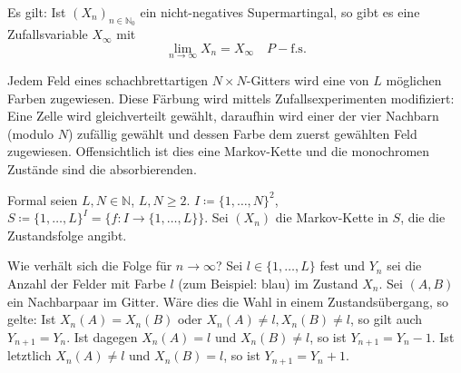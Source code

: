 \documentclass[a4paper,twoside,DIV15,BCOR12mm]{scrbook}
\begin{document}
\begin{bemerkung}
Es gilt: Ist $(X_n)_{n\in\mathbb N_0}$ ein nicht-negatives Supermartingal, so gibt es eine Zufallsvariable $X_\infty$ mit 
\[
\lim_{n\to\infty} X_n = X_\infty \quad P-\text{f.s.}
\]
\end{bemerkung}

\begin{beispiel}
Jedem Feld eines schachbrettartigen $N\times N$-Gitters wird eine von $L$ möglichen Farben zugewiesen. Diese Färbung wird mittels Zufallsexperimenten modifiziert: Eine Zelle wird gleichverteilt gewählt, daraufhin wird einer der vier Nachbarn (modulo $N$) zufällig gewählt und dessen Farbe dem zuerst gewählten Feld zugewiesen. Offensichtlich ist dies eine Markov-Kette und die monochromen Zustände sind die absorbierenden.

\begin{center}
\end{center}

Formal seien $L,N\in \mathbb N$, $L,N\ge 2$. $I\coloneqq\{1,\ldots,N\}^2$, $S\coloneqq \{1,\ldots,L\}^I = \{f:I\to \{1,\ldots,L\}\}$. Sei $(X_n)$ die Markov-Kette in $S$, die die Zustandsfolge angibt.

Wie verhält sich die Folge für $n\to\infty$? Sei $l\in\{1,\ldots,L\}$ fest und $Y_n$ sei die Anzahl der Felder mit Farbe $l$ (zum Beispiel: blau) im Zustand $X_n$. Sei $(A,B)$ ein Nachbarpaar im Gitter. Wäre dies die Wahl in einem Zustandsübergang, so gelte: Ist $X_n(A)=X_n(B)$ oder $X_n(A)\ne l, X_n(B)\ne l$, so gilt auch $Y_{n+1}=Y_n$. Ist dagegen $X_n(A)=l$ und $X_n(B)\ne l$, so ist $Y_{n+1}=Y_n-1$. Ist letztlich $X_n(A)\ne l$ und $X_n(B) =l$, so ist $Y_{n+1}=Y_n+1$.


\end{beispiel}
\end{document}
